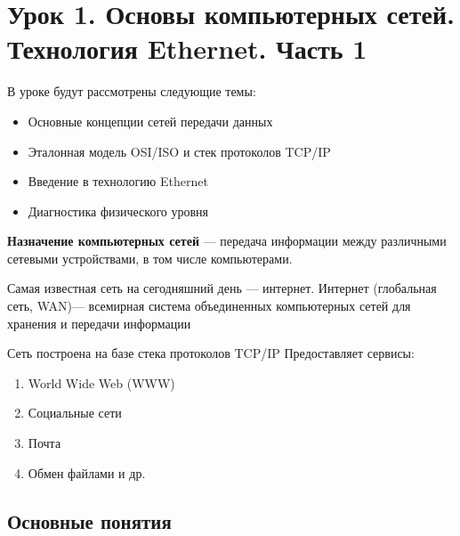 \documentclass[a4paper]{article}
\begin{document}
\section{Урок 1. Основы компьютерных сетей. Технология Ethernet. Часть 1}
В уроке будут рассмотрены следующие темы:
\begin{itemize}
	\item Основные концепции сетей передачи данных
	\item Эталонная модель OSI/ISO и стек протоколов TCP/IP
	\item Введение в технологию Ethernet
	\item Диагностика физического уровня
\end{itemize}

\textbf{Назначение компьютерных сетей} --- передача информации между различными сетевыми устройствами, в том числе компьютерами. 

Самая известная сеть на сегодняшний день --- интернет. Интернет (глобальная сеть, WAN)--- всемирная система объединенных компьютерных сетей для хранения и передачи информации

Сеть построена на базе стека протоколов TCP/IP
Предоставляет сервисы:
\begin{enumerate}
	\item World Wide Web (WWW)
	\item Социальные сети
	\item Почта
	\item Обмен файлами и др.
\end{enumerate}

\subsection{Основные понятия}
\end{document}
